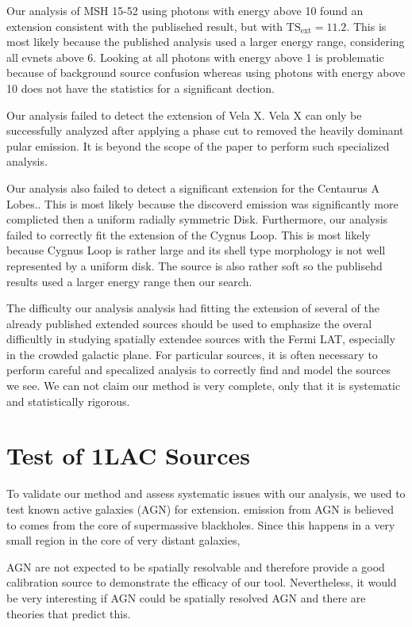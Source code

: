 \documentclass[preprint]{aastex}
\newcommand{\gev}{\text{GeV}\xspace}
\newcommand{\tsext}{{\ensuremath{\text{TS}_\text{ext}}}\xspace}
\newcommand{\pointlike}{\text{\em pointlike}\xspace}
\begin{document}
Our analysis of MSH 15-52 using photons with energy above 10 \gev found an extension
consistent with the publisehed result, but with $\tsext=11.2$. This is
most likely because the published analysis used a larger energy range,
considering all evnets above 6\gev. Looking at all photons with
energy above 1\gev 
is problematic because of background source confusion whereas using photons
with energy above 10\gev does not have the statistics for a significant dection.

Our analysis failed to detect the extension of Vela X. Vela X can only be
successfully analyzed after applying a phase cut to removed the heavily
dominant pular emission. It is beyond the scope of the paper to perform
such specialized analysis.

Our analysis also failed to detect a significant extension for the
Centaurus A Lobes.\cite{CenA paper}. This is most likely because the
discoverd emission was significantly more complicted then a uniform
radially symmetric Disk.  Furthermore, our analysis failed to correctly
fit the extension of the Cygnus Loop\cite{Cygnus Loop Paper}.  This is
most likely because Cygnus Loop is rather large and its shell type
morphology is not well represented by a uniform disk. The source is
also rather soft so the publisehd results used a larger energy range
then our search.

The difficulty our analysis analysis had fitting the extension of several
of the already published extended sources should be used to emphasize the
overal difficultly in studying spatially extendee sources with the Fermi
LAT, especially in the crowded galactic plane. For particular sources,
it is often necessary to perform careful and specalized analysis to
correctly find and model the sources we see. We can not claim our method
is very complete, only that it is systematic and statistically rigorous.

\section{Test of 1LAC Sources}

To validate our method and assess systematic issues with our
analysis, we used \pointlike to test known active galaxies (AGN) for extension.
\gev emission from AGN is believed to comes from the
core of supermassive blackholes. Since this happens in a very small region
in the core of very distant galaxies,

AGN are not expected to be spatially resolvable and therefore
provide a good calibration source to demonstrate the efficacy of our
tool. Nevertheless, it would be very interesting if AGN could be
spatially resolved AGN and there are theories that predict
this\cite{pair_halo_paper}.
\end{document}
